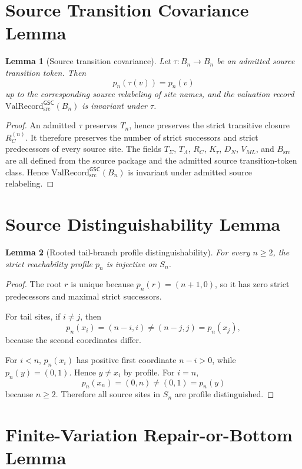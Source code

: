 \documentclass[11pt]{article}
\newcommand{\ValRecord}{\mathrm{ValRecord}_{\mathrm{src}}^{\mathsf{GSC}}}
\newcommand{\Bn}{B_n}
\newtheorem{lemma}{Lemma}
\begin{document}
\section{Source Transition Covariance Lemma}
\label{source-transition-covariance-lemma}

\begin{lemma}[Source transition covariance]
Let \(\tau:\Bn\to \Bn\) be an admitted source transition token. Then
\[
p_n(\tau(v))=p_n(v)
\]
up to the corresponding source relabeling of site names, and the valuation
record \(\ValRecord(\Bn)\) is invariant under \(\tau\).
\end{lemma}

\begin{proof}
An admitted \(\tau\) preserves \(T_n\), hence preserves the strict transitive
closure \(R_C^{(n)}\). It therefore preserves the number of strict successors
and strict predecessors of every source site. The fields \(T_\Sigma\),
\(T_\Lambda\), \(R_C\), \(K_\tau\), \(D_N\), \(V_{ML}\), and
\(B_{\mathrm{src}}\) are all defined from the source package and the admitted
source transition-token class. Hence \(\ValRecord(\Bn)\) is invariant under
admitted source relabeling.
\end{proof}

\section{Source Distinguishability Lemma}
\label{source-distinguishability-lemma}

\begin{lemma}[Rooted tail-branch profile distinguishability]
For every \(n\ge 2\), the strict reachability profile \(p_n\) is injective on
\(S_n\).
\end{lemma}

\begin{proof}
The root \(r\) is unique because \(p_n(r)=(n+1,0)\), so it has zero strict
predecessors and maximal strict successors.

For tail sites, if \(i\ne j\), then
\[
p_n(x_i)=(n-i,i)\ne(n-j,j)=p_n(x_j),
\]
because the second coordinates differ.

For \(i<n\), \(p_n(x_i)\) has positive first coordinate \(n-i>0\), while
\(p_n(y)=(0,1)\). Hence \(y\ne x_i\) by profile. For \(i=n\),
\[
p_n(x_n)=(0,n)\ne(0,1)=p_n(y)
\]
because \(n\ge 2\). Therefore all source sites in \(S_n\) are profile
distinguished.
\end{proof}

\section{Finite-Variation Repair-or-Bottom Lemma}
\label{finite-variation-repair-or-bottom-lemma}
\end{document}
